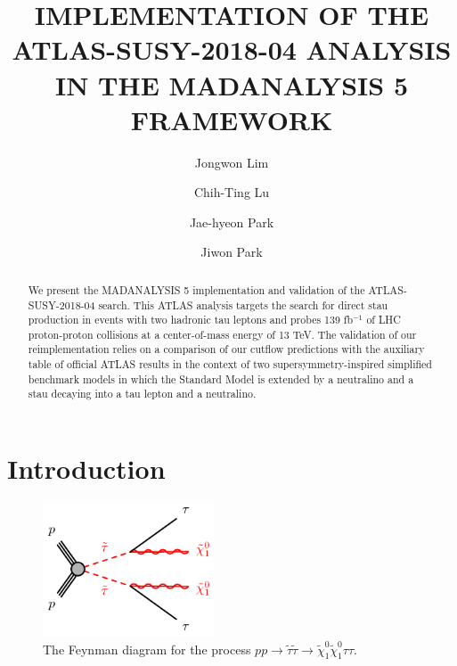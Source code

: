 \documentclass{ws-mpla}
\begin{document}

\catchline{}{}{}{}{}

\title{IMPLEMENTATION OF THE ATLAS-SUSY-2018-04 ANALYSIS IN THE MADANALYSIS 5 FRAMEWORK}

\author{\footnotesize Jongwon Lim}
\address{
  Department of Physics, Hanyang University, Seoul 04763, Republic of Korea}

\author{\footnotesize Chih-Ting Lu}
\address{
  School of Physics, KIAS, Seoul 02455, Republic of Korea}

\author{\footnotesize Jae-hyeon Park}
\address{
  School of Physics, KIAS, Seoul 02455, Republic of Korea}

\author{\footnotesize Jiwon Park}
\address{
  Department of Physics, Hanyang University, Seoul 04763, Republic of Korea}
\maketitle


\begin{abstract}
We present the MADANALYSIS 5 implementation and validation of the ATLAS-SUSY-2018-04 search.
This ATLAS analysis targets the search for direct stau production in events with two hadronic tau leptons and probes 139 fb$^{-1}$ of LHC proton-proton collisions at a center-of-mass energy of 13 TeV.
The validation of our reimplementation relies on a comparison of our cutflow predictions with the auxiliary table of official ATLAS results in the context of two supersymmetry-inspired simplified benchmark models in which the Standard Model is extended by a neutralino and a stau decaying into a tau lepton and a neutralino.
\end{abstract}


\section{Introduction}

\begin{figure}[t]
  \centerline{\includegraphics[width=2.0in]{fig_01}}
  \vspace*{8pt}
  \caption{The Feynman diagram for the process $pp\rightarrow\tilde{\tau}\tilde{\tau}\rightarrow\tilde{\chi}^0_1\tilde{\chi}^0_1\tau\tau$.\protect\label{fig:fig_01}}
\end{figure}
\end{document}
